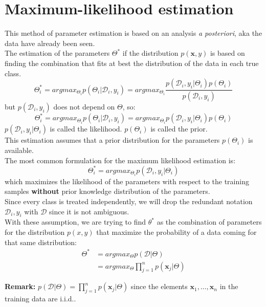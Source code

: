 \section{Maximum-likelihood estimation}
\label{par:maximum_likelihood_estim} This method of parameter estimation is based
on an analysis \textit{a posteriori}, aka the data have already been seen.\\ The
estimation of the parameters $\Theta^{*}$ if the distribution $p(\pmb{x}, y)$ is
based on finding the combination that fits at best the distribution of the data in
each true class.
\[
	\Theta_{i}^{*}= argmax_{\Theta_i}p(\Theta_{i}|\mathcal{D}_{i}, y_{i}) = argmax_{\Theta_i}
	\frac{p(\mathcal{D}_{i}, y_{i}|\Theta_{i})p(\Theta_{i})}{p(\mathcal{D}_{i}, y_{i})}
\]
but $p(\mathcal{D}_{i}, y_{i})$ does not depend on $\Theta$, so:
\[
	\Theta_{i}^{*}= argmax_{\Theta_i}p(\Theta_{i}|\mathcal{D}_{i}, y_{i}) = argmax_{\Theta_i}
	p(\mathcal{D}_{i}, y_{i}|\Theta_{i})p(\Theta_{i})
\]
$p(\mathcal{D}_{i}, y_{i}|\Theta_{i})$ is called the likelihood. $p(\Theta_{i})$
is called the prior.\\ This estimation assumes that a prior distribution for the
parameters $p(\Theta_{i})$ is available.\\ The most common formulation for the maximum
likelihood estimation is:
\begin{equation}
	\Theta_{i}^{*}= argmax_{\Theta_i}p(\mathcal{D}_{i}, y_{i}| \Theta_{i}) \label{eq:max_likelihood_common}
\end{equation}
which maximizes the likelihood of the parameters with respect to the training
samples\textbf{ without } prior knowledge distribution of the parameters.\\

Since every class is treated independently, we will drop the redundant notation
$\mathcal{D}_{i}, y_{i}$ with $\mathcal{D}$ since it is not ambiguous.\\

With these assumption, we are trying to find $\theta^{*}$ as the combination of
parameters for the distribution $p(x, y)$ that maximize the probability of a
data coming for that same distribution:
\begin{align*}
	\Theta^{*} & = argmax_{\Theta}p(\mathcal{D}| \Theta)               \\
	           & = argmax_{\Theta}\prod_{j=1}^{n}p(\pmb{x}_{j}|\Theta)
\end{align*}

\textbf{Remark:} $p(\mathcal{D}| \Theta) = \prod_{j=1}^{n}p(\pmb{x}_{j}|\Theta)$
since the elements $\pmb{x}_{1}, \hdots, \pmb{x}_{n}$ in the training data are i.i.d..

